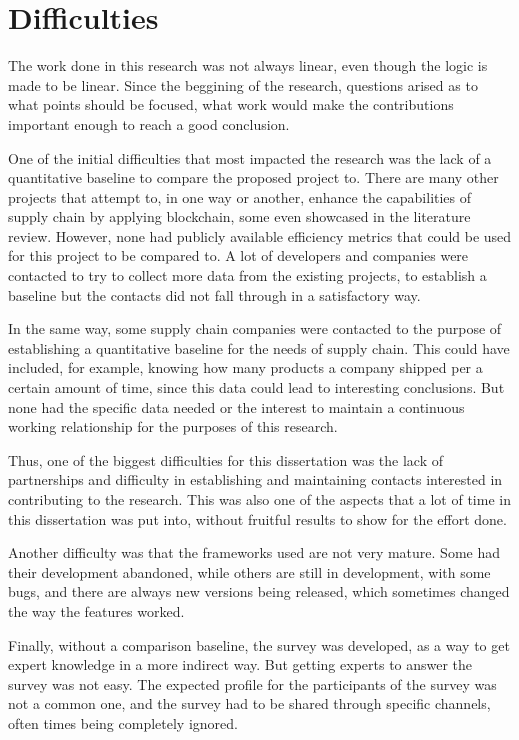 \section{Difficulties}

The work done in this research was not always linear, even though the logic is made to be linear. Since the beggining of the research, questions arised as to what points should be focused, what work would make the contributions important enough to reach a good conclusion. 

One of the initial difficulties that most impacted the research was the lack of a quantitative baseline to compare the proposed project to. There are many other projects that attempt to, in one way or another, enhance the capabilities of supply chain by applying blockchain, some even showcased in the literature review. However, none had publicly available efficiency metrics that could be used for this project to be compared to. A lot of developers and companies were contacted to try to collect more data from the existing projects, to establish a baseline but the contacts did not fall through in a satisfactory way. 

In the same way, some supply chain companies were contacted to the purpose of establishing a quantitative baseline for the needs of supply chain. This could have included, for example, knowing how many products a company shipped per a certain amount of time, since this data could lead to interesting conclusions. But none had the specific data needed or the interest to maintain a continuous working relationship for the purposes of this research.

Thus, one of the biggest difficulties for this dissertation was the lack of partnerships and difficulty in establishing and maintaining contacts interested in contributing to the research. This was also one of the aspects that a lot of time in this dissertation was put into, without fruitful results to show for the effort done.


Another difficulty was that the frameworks used are not very mature. Some had their development abandoned, while others are still in development, with some bugs, and there are always new versions being released, which sometimes changed the way the features worked.

Finally, without a comparison baseline, the survey was developed, as a way to get expert knowledge in a more indirect way. But getting experts to answer the survey was not easy. The expected profile for the participants of the survey was not a common one, and the survey had to be shared through specific channels, often times being completely ignored.

